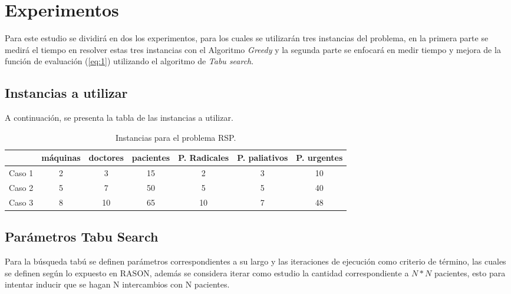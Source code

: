 \documentclass[letter, 10pt]{article}
\begin{document}
\section{Experimentos}
Para este estudio se dividirá en dos los experimentos, para los cuales se utilizarán tres instancias del problema, en la primera parte se medirá el tiempo en resolver estas tres instancias con el Algoritmo \textit{Greedy} y la segunda parte se enfocará en medir tiempo y mejora de la función de evaluación (\ref{eq:1}) utilizando el algoritmo de \textit{Tabu search}.
\subsection{Instancias a utilizar}
A continuación, se presenta la tabla de las instancias a utilizar.

\begin{table}[ht]
\centering
\begin{tabular}{l|c|c|c|c|c|c|}
\cline{2-7}
{\ul } &
  \multicolumn{1}{l|}{máquinas} &
  \multicolumn{1}{l|}{doctores} &
  \multicolumn{1}{l|}{pacientes} &
  \multicolumn{1}{l|}{P. Radicales} &
  \multicolumn{1}{l|}{P. paliativos} &
  \multicolumn{1}{l|}{P. urgentes} \\ \hline
\multicolumn{1}{|l|}{Caso 1} & 2 & 3  & 15 & 2  & 3 & 10 \\ \hline
\multicolumn{1}{|l|}{Caso 2} & 5 & 7  & 50 & 5  & 5 & 40 \\ \hline
\multicolumn{1}{|l|}{Caso 3} & 8 & 10 & 65 & 10 & 7 & 48 \\ \hline
\end{tabular}
\caption{Instancias para el problema RSP.}
\label{table:tb}
\end{table}

\subsection{Parámetros Tabu Search}
Para la búsqueda tabú se definen parámetros correspondientes a su largo y las iteraciones de ejecución como criterio de término, las cuales se definen según lo expuesto en RASON\cite{siete}, además se considera iterar como estudio la cantidad correspondiente a $N*N$ pacientes, esto para intentar inducir que se hagan N intercambios con N pacientes.
\end{document}
